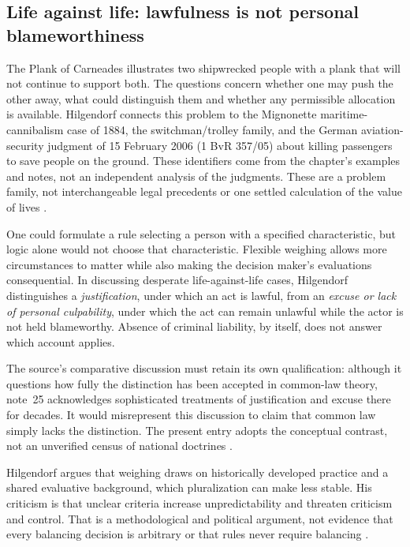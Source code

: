 \subsection{Life against life: lawfulness is not personal blameworthiness}

The Plank of Carneades illustrates two shipwrecked people with a plank that
will not continue to support both. The questions concern whether one may
push the other away, what could distinguish them and whether any permissible
allocation is available. Hilgendorf connects this problem to the Mignonette
maritime-cannibalism case of 1884, the switchman/trolley family, and the
German aviation-security judgment of 15 February 2006 (1 BvR 357/05)
about killing passengers to save people on the ground. These identifiers
come from the chapter's examples and notes, not an independent analysis of
the judgments. These are a problem family, not interchangeable legal
precedents or one settled calculation of the value of lives
\parencite[pp.~663--664, notes~22--24 on p.~665]{Hilgendorf2021LegalLogic}.

One could formulate a rule selecting a person with a specified characteristic,
but logic alone would not choose that characteristic. Flexible weighing
allows more circumstances to matter while also making the decision maker's
evaluations consequential. In discussing desperate life-against-life cases,
Hilgendorf distinguishes a \emph{justification}, under which an act is
lawful, from an \emph{excuse or lack of personal culpability}, under which
the act can remain unlawful while the actor is not held blameworthy.
Absence of criminal liability, by itself, does not answer which account applies.

The source's comparative discussion must retain its own qualification:
although it questions how fully the distinction has been accepted in
common-law theory, note~25 acknowledges sophisticated treatments of
justification and excuse there for decades. It would misrepresent this
discussion to claim that common law simply lacks the distinction. The
present entry adopts the conceptual contrast, not an unverified census of
national doctrines \parencite[p.~664, note~25 on p.~665]{Hilgendorf2021LegalLogic}.

Hilgendorf argues that weighing draws on historically developed practice
and a shared evaluative background, which pluralization can make less
stable. His criticism is that unclear criteria increase unpredictability
and threaten criticism and control. That is a methodological and political
argument, not evidence that every balancing decision is arbitrary or that
rules never require balancing
\parencite[p.~664, note~26 on p.~665]{Hilgendorf2021LegalLogic}.

